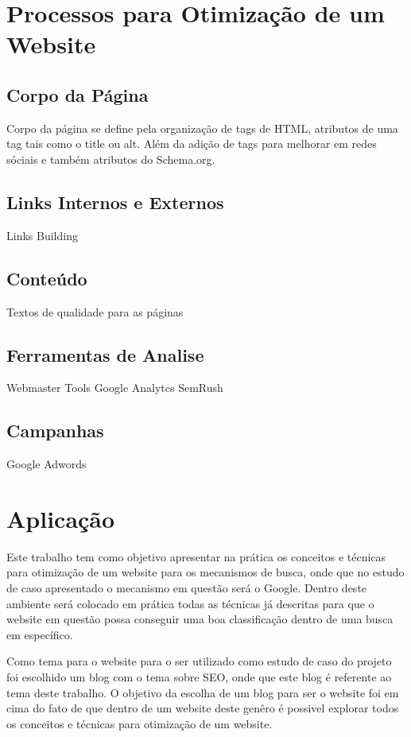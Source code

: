 \documentclass[
	12pt,				%
	openright,			%
	twoside,			%
	a4paper,			%
	english,			%
	french,				%
	spanish,			%
	brazil				%
	]{abntex2}
\begin{document}
\chapter{Processos para Otimização de um Website}

\section{Corpo da Página}

Corpo da página se define pela organização de tags de HTML, atributos de uma tag tais como o title ou alt. Além da adição de tags para melhorar em redes sóciais e também atributos do Schema.org.

\section{Links Internos e Externos}

Links Building

\section{Conteúdo}

Textos de qualidade para as páginas

\section{Ferramentas de Analise}

Webmaster Tools
Google Analytcs
SemRush

\section{Campanhas}

Google Adwords



\chapter{Aplicação}

Este trabalho tem como objetivo apresentar na prática os conceitos e técnicas para otimização de um website para os mecanismos de busca, onde que no estudo de caso apresentado o mecanismo em questão será o Google. Dentro deste ambiente será colocado em prática todas as técnicas já descritas para que o website em questão possa conseguir uma boa classificação dentro de uma busca em específico.

Como tema para o website para o ser utilizado como estudo de caso do projeto foi escolhido um blog com o tema sobre SEO, onde que este blog é referente ao tema deste trabalho. O objetivo da escolha de um blog para ser o website foi em cima do fato de que dentro de um website deste genêro é possivel explorar todos os conceitos e técnicas para otimização de um website.
\end{document}
